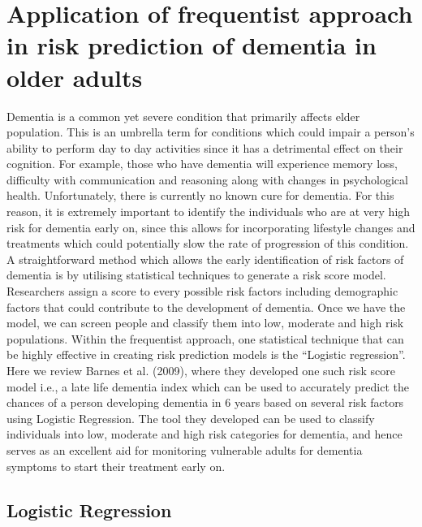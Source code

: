 \documentclass[12pt,letterpaper]{article}
\begin{document}
\section{Application of frequentist approach in risk prediction of dementia in older adults}
Dementia is a common yet severe condition that primarily affects elder population. This is an umbrella term for conditions which could impair a person's ability to perform day to day activities since it has a detrimental effect on their cognition. For example, those who have dementia will experience memory loss, difficulty with communication and reasoning along with changes in psychological health. Unfortunately, there is currently no known cure for dementia. For this reason, it is extremely important to identify the individuals who are at very high risk for dementia early on, since this allows for incorporating lifestyle changes and treatments which could potentially slow the rate of progression of this condition. A straightforward method which allows the early identification of risk factors of dementia is by utilising statistical techniques to generate a risk score model. Researchers assign a score to every possible risk factors including demographic factors that could contribute to the development of dementia. Once we have the model, we can screen people and classify them into low, moderate and high risk populations. Within the frequentist approach, one statistical technique that can be highly effective in creating risk prediction models is the ``Logistic regression''. Here we review Barnes et al. (2009), where they developed one such risk score model i.e., a late life dementia index which can be used to accurately predict the chances of a person developing dementia in 6 years based on several risk factors using Logistic Regression. The tool they developed can be used to classify individuals into low, moderate and high risk categories for dementia, and hence serves as an excellent aid for monitoring vulnerable adults for dementia symptoms to start their treatment early on.  

\subsection{Logistic Regression}
\end{document}
